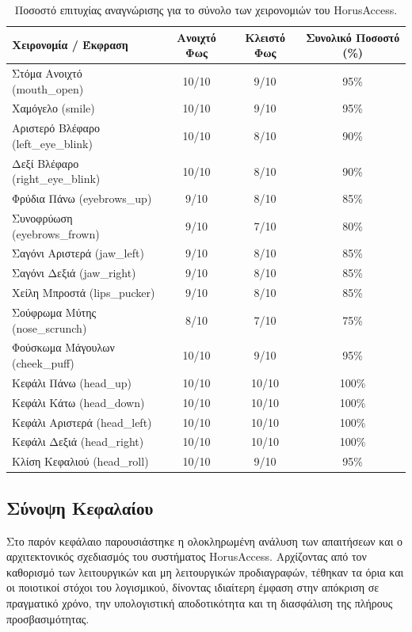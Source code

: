 \documentclass[twoside, a4paper, 11pt]{article}
\newcommand{\textlatin}[1]{\textenglish{#1}}
\begin{document}
\begin{table}[htbp]
    \centering
    \caption{Ποσοστό επιτυχίας αναγνώρισης για το σύνολο των χειρονομιών του \textlatin{HorusAccess}.}
    \label{tab:gesture_success_rate}
    \begin{tabular}{|l|c|c|c|}
        \hline
        \textbf{Χειρονομία / Έκφραση} & \textbf{Ανοιχτό Φως} & \textbf{Κλειστό Φως} & \textbf{Συνολικό Ποσοστό (\%)} \\
        \hline
        Στόμα Ανοιχτό (\textlatin{mouth\_open}) & 10/10 & 9/10 & 95\% \\
        Χαμόγελο (\textlatin{smile}) & 10/10 & 9/10 & 95\% \\
        Αριστερό Βλέφαρο (\textlatin{left\_eye\_blink}) & 10/10 & 8/10 & 90\% \\
        Δεξί Βλέφαρο (\textlatin{right\_eye\_blink}) & 10/10 & 8/10 & 90\% \\
        Φρύδια Πάνω (\textlatin{eyebrows\_up}) & 9/10 & 8/10 & 85\% \\
        Συνοφρύωση (\textlatin{eyebrows\_frown}) & 9/10 & 7/10 & 80\% \\
        Σαγόνι Αριστερά (\textlatin{jaw\_left}) & 9/10 & 8/10 & 85\% \\
        Σαγόνι Δεξιά (\textlatin{jaw\_right}) & 9/10 & 8/10 & 85\% \\
        Χείλη Μπροστά (\textlatin{lips\_pucker}) & 9/10 & 8/10 & 85\% \\
        Σούφρωμα Μύτης (\textlatin{nose\_scrunch}) & 8/10 & 7/10 & 75\% \\
        Φούσκωμα Μάγουλων (\textlatin{cheek\_puff}) & 10/10 & 9/10 & 95\% \\
        Κεφάλι Πάνω (\textlatin{head\_up}) & 10/10 & 10/10 & 100\% \\
        Κεφάλι Κάτω (\textlatin{head\_down}) & 10/10 & 10/10 & 100\% \\
        Κεφάλι Αριστερά (\textlatin{head\_left}) & 10/10 & 10/10 & 100\% \\
        Κεφάλι Δεξιά (\textlatin{head\_right}) & 10/10 & 10/10 & 100\% \\
        Κλίση Κεφαλιού (\textlatin{head\_roll}) & 10/10 & 9/10 & 95\% \\
        \hline
    \end{tabular}
\end{table}

\clearpage
\subsection{Σύνοψη Κεφαλαίου}
Στο παρόν κεφάλαιο παρουσιάστηκε η ολοκληρωμένη ανάλυση των απαιτήσεων και ο αρχιτεκτονικός σχεδιασμός του συστήματος \textlatin{HorusAccess}. Αρχίζοντας από τον καθορισμό των λειτουργικών και μη λειτουργικών προδιαγραφών, τέθηκαν τα όρια και οι ποιοτικοί στόχοι του λογισμικού, δίνοντας ιδιαίτερη έμφαση στην απόκριση σε πραγματικό χρόνο, την υπολογιστική αποδοτικότητα και τη διασφάλιση της πλήρους προσβασιμότητας.
\end{document}
